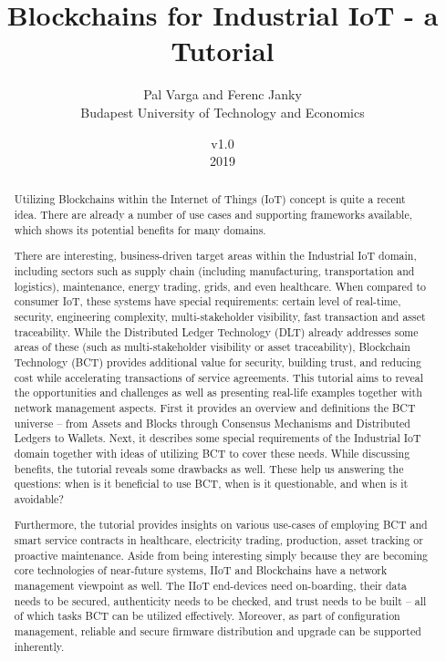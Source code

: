 \documentclass[a4paper]{article}
\title{Blockchains for Industrial IoT - a Tutorial}
\author{Pal Varga and Ferenc Janky \\ Budapest University of Technology and Economics}
\date{v1.0 \\ 2019}
\begin{document}
\maketitle

\begin{abstract}
Utilizing Blockchains within the Internet of Things (IoT) concept is quite a recent idea. There are already a number of use cases and supporting frameworks available, which shows its potential benefits for many domains.

There are interesting, business-driven target areas within the Industrial IoT domain, including sectors such as supply chain (including manufacturing, transportation and logistics), maintenance, energy trading, grids, and even healthcare. When compared to consumer IoT, these systems have special requirements: certain level of real-time, security, engineering complexity, multi-stakeholder visibility, fast transaction and asset traceability. While the Distributed Ledger Technology (DLT) already addresses some areas of these (such as multi-stakeholder visibility or asset traceability), Blockchain Technology (BCT) provides additional value for security, building trust, and reducing cost while accelerating transactions of service agreements.
This tutorial aims to reveal the opportunities and challenges as well as presenting real-life examples together with network management aspects. First it provides an overview and definitions the BCT universe – from Assets and Blocks through Consensus Mechanisms and Distributed Ledgers to Wallets. Next, it describes some special requirements of the Industrial IoT domain together with ideas of utilizing BCT to cover these needs. While discussing benefits, the tutorial reveals some drawbacks as well. These help us answering the questions: when is it beneficial to use BCT, when is it questionable, and when is it avoidable?

Furthermore, the tutorial provides insights on various use-cases of employing BCT and smart service contracts in healthcare, electricity trading, production, asset tracking or proactive maintenance. Aside from being interesting simply because they are becoming core technologies of near-future systems, IIoT and Blockchains have a network management viewpoint as well. The IIoT end-devices need on-boarding, their data needs to be secured, authenticity needs to be checked, and trust needs to be built – all of which tasks BCT can be utilized effectively. Moreover, as part of configuration management, reliable and secure firmware distribution and upgrade can be supported inherently.


\end{abstract}
\end{document}
